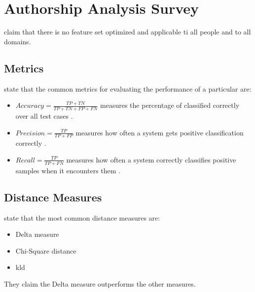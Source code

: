 \section{Authorship Analysis Survey}
\label{sec:authorship_analysis_survey}

\citet{elmanarelbouanani_authorship_2014} claim that there is no feature set optimized and applicable ti all people and to all domains.

\subsection{Metrics}
\citet{elmanarelbouanani_authorship_2014} state that the common metrics for evaluating the performance of a particular are:
\begin{itemize}
    \item $Accuracy = \frac{TP + TN}{TP + TN + FP + FN}$ \cite{elmanarelbouanani_authorship_2014,neal_surveying_2018} 
    measures the percentage of classified correctly over all test cases \cite{neal_surveying_2018}.

    \item $Precision = \frac{TP}{TP + FP}$ \cite{elmanarelbouanani_authorship_2014,neal_surveying_2018} 
    measures how often a system gets positive classification correctly \cite{neal_surveying_2018}.

    \item $Recall = \frac{TP}{TP + FN}$ \cite{elmanarelbouanani_authorship_2014,neal_surveying_2018} 
    measures how often a system correctly classifies positive samples when it encounters them \cite{neal_surveying_2018}.
\end{itemize}


\subsection{Distance Measures}
\citet{elmanarelbouanani_authorship_2014} state that the most common distance measures are:
\begin{itemize}
    \item Delta measure
    \item Chi-Square distance
    \item \ac{kld}
\end{itemize}
They claim the Delta measure outperforms the other measures.